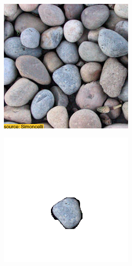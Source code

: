 \begin{figure}[]
\begin{subfigure}{\textwidth}
        \begin{subfigure}{0.24\textwidth}
            \centering
            \includegraphics[width=\textwidth]{images/04-experiment01/pebbles/target.jpg}
            \caption*{}
        \end{subfigure}
        \hfill
        \begin{subfigure}{0.24\textwidth}
            \centering
            \includegraphics[width=\textwidth]{images/04-experiment01/pebbles/one_bg.jpg}

\end{subfigure}
\end{subfigure}
\end{figure}
